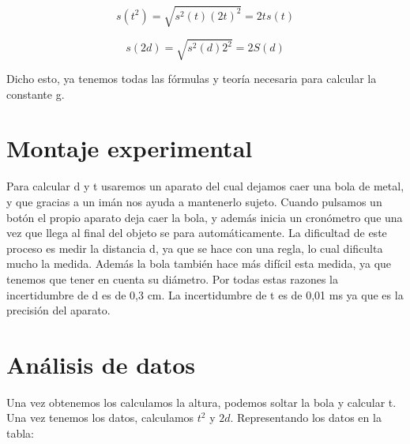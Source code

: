 \documentclass[12pt,a4paper]{book}
\begin{document}
\begin{equation}
s(t^2)=\sqrt{s^2(t)(2t)^2}=2ts(t)
\label{Ec: t^2 incertidumbre caida libre}
\end{equation}

\begin{equation}
s(2d)=\sqrt{s^2(d)2^2}=2S(d)
\label{Ec: 2d incertidumbre caida libre}
\end{equation}

Dicho esto, ya tenemos todas las fórmulas y teoría necesaria para calcular la constante g.

\section{Montaje experimental}
Para calcular d y t usaremos un aparato del cual dejamos caer una bola de metal, y que gracias a un imán nos ayuda a mantenerlo sujeto. Cuando pulsamos un botón el propio aparato deja caer la bola, y además inicia un cronómetro que una vez que llega al final del objeto se para automáticamente. La dificultad de este proceso es medir la distancia d, ya que se hace con una regla, lo cual dificulta mucho la medida. Además la bola también hace más difícil esta medida, ya que tenemos que tener en cuenta su diámetro. Por todas estas razones la incertidumbre de d es de 0,3 cm. La incertidumbre de t es de 0,01 ms ya que es la precisión del aparato.

\section{Análisis de datos}

Una vez obtenemos los calculamos la altura, podemos soltar la bola y calcular t. Una vez tenemos los datos, calculamos $t^2$ y $2d$. Representando los datos en la tabla:
\end{document}
